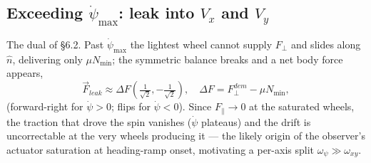 \documentclass[11pt]{article}
\begin{document}
\subsection{Exceeding $\dot\psi_{\max}$: leak into $V_x$ and $V_y$}
The dual of \S6.2. Past $\dot\psi_{\max}$ the lightest wheel cannot supply $F_\perp$ and slides along
$\hat n$, delivering only $\mu N_{\min}$; the symmetric balance breaks and a net body force appears,
\begin{equation}
\vec F_{leak}\approx\Delta F\left(\tfrac{1}{\sqrt2},-\tfrac{1}{\sqrt2}\right),\quad\Delta F=F_\perp^{dem}-\mu N_{\min},
\end{equation}
(forward-right for $\dot\psi>0$; flips for $\dot\psi<0$). Since $F_\parallel\to0$ at the saturated
wheels, the traction that drove the spin vanishes ($\dot\psi$ plateaus) and the drift is
uncorrectable at the very wheels producing it --- the likely origin of the observer's actuator
saturation at heading-ramp onset, motivating a per-axis split $\omega_\psi\gg\omega_{xy}$.
\end{document}
